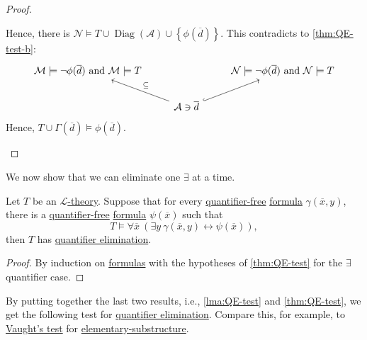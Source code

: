 \begin{proof}
\begin{explanation}
		Hence, there is \(\mathcal{N} \models T \cup \mathop{\mathrm{Diag}}(\mathcal{A} ) \cup \left\{ \phi (\overline{d} ) \right\} \). This contradicts to \autoref{thm:QE-test-b}:
		\[\begin{tikzcd}
				{\mathcal{M}\models \lnot\phi(\overline{d})\text{ and }\mathcal{M}\models T} && {\mathcal{N}\models \lnot\phi(\overline{d})\text{ and }\mathcal{N}\models T} \\
				& {\mathcal{A}\ni \overline{d}}
				\arrow[hook, from=2-2, to=1-3]
				\arrow["\subseteq"', from=2-2, to=1-1]
			\end{tikzcd}\]
		Hence, \(T \cup \Gamma (\overline{d} ) \models \phi (\overline{d} )\).
	\end{explanation}
\end{proof}

We now show that we can eliminate one \(\exists \) at a time.

\begin{lemma}\label{lma:QE-test}
	Let \(T\) be an \hyperref[def:theory]{\(\mathcal{L} \)-theory}. Suppose that for every \hyperref[not:quantifier-free]{quantifier-free} \hyperref[def:formula]{formula} \(\gamma (\overline{x} , y)\), there is a \hyperref[not:quantifier-free]{quantifier-free} \hyperref[def:formula]{formula} \(\psi (\overline{x} )\) such that
	\[
		T \models \forall \overline{x} \ (\exists y\ \gamma (\overline{x} , y) \leftrightarrow \psi (\overline{x} )),
	\]
	then \(T\) has \hyperref[def:quantifier-elimination]{quantifier elimination}.
\end{lemma}
\begin{proof}
	By induction on \hyperref[def:formula]{formulas} with the hypotheses of \autoref{thm:QE-test} for the \(\exists \) quantifier case.
\end{proof}

By putting together the last two results, i.e., \autoref{lma:QE-test} and \autoref{thm:QE-test}, we get the following test for \hyperref[def:quantifier-elimination]{quantifier elimination}. Compare this, for example, to \hyperref[thm:Vaught-test]{Vaught's test} for \hyperref[def:elementary-substructure]{elementary-substructure}.

